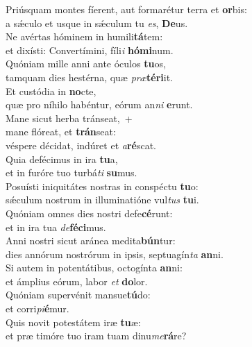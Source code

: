 \evenverse Priúsquam montes fíerent, aut formarétur terra et \textbf{or}bis:~\*\\
\evenverse a sǽculo et usque in sǽculum tu \textit{es}, \textbf{De}us.\\
\oddverse Ne avértas hóminem in humili\textbf{tá}tem:~\*\\
\oddverse et dixísti: Convertímini, fíli\textit{i} \textbf{hó}\textbf{mi}num.\\
\evenverse Quóniam mille anni ante óculos \textbf{tu}os,~\*\\
\evenverse tamquam dies hestérna, quæ \textit{præ}\textbf{té}\textbf{ri}it.\\
\oddverse Et custódia in \textbf{no}cte,~\*\\
\oddverse quæ pro níhilo habéntur, eórum an\textit{ni} \textbf{e}runt.\\
\evenverse Mane sicut herba tránseat,~+\\
\evenverse  mane flóreat, et \textbf{trán}seat:~\*\\
\evenverse véspere décidat, indúret et \textit{a}\textbf{ré}scat.\\
\oddverse Quia defécimus in ira \textbf{tu}a,~\*\\
\oddverse et in furóre tuo turbá\textit{ti} \textbf{su}mus.\\
\evenverse Posuísti iniquitátes nostras in conspéctu \textbf{tu}o:~\*\\
\evenverse sǽculum nostrum in illuminatióne vul\textit{tus} \textbf{tu}i.\\
\oddverse Quóniam omnes dies nostri defe\textbf{cé}runt:~\*\\
\oddverse et in ira tua \textit{de}\textbf{fé}\textbf{ci}mus.\\
\evenverse Anni nostri sicut aránea medita\textbf{bún}tur:~\*\\
\evenverse dies annórum nostrórum in ipsis, septuagín\textit{ta} \textbf{an}ni.\\
\oddverse Si autem in potentátibus, octogínta \textbf{an}ni:~\*\\
\oddverse et ámplius eórum, labor \textit{et} \textbf{do}lor.\\
\evenverse Quóniam supervénit mansue\textbf{tú}do:~\*\\
\evenverse et corri\textit{pi}\textbf{é}mur.\\
\oddverse Quis novit potestátem iræ \textbf{tu}æ:~\*\\
\oddverse et præ timóre tuo iram tuam dinu\textit{me}\textbf{rá}re?\\
